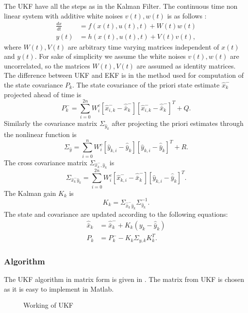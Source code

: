The UKF have all the steps as in the Kalman Filter. The continuous time non linear system with additive white noises $v(t),w(t)$ is as follows \citep{sim07}:
\begin{equation}
    \label{eq:ukf_nlsys}
    \begin{split}
       \frac{dx}{dt} &= f(x(t),u(t),t) + W(t)w(t) \\
       y(t) &= h(x(t),u(t),t) + V(t)v(t),
    \end{split}
\end{equation} 
where $W(t),V(t)$ are arbitrary time varying matrices independent of $x(t)$ and $y(t)$. For sake of simplicity we assume the white noises $v(t),w(t)$  are uncorrelated, so the matrices $W(t),V(t)$ are assumed as identity matrices. The difference between UKF and EKF is in the method used for computation of the state covariance $P_k$. The state covariance of the priori state estimate $\hat x_k^-$ projected ahead of time is $$ P_k^- = \sum \limits_{i=0}^{2n} W_i^c [\hat x_{i,k}^- - \hat{\bar x}_k^-] [\hat x_{i,k}^- - \hat{\bar x}_k^-]^T + Q. $$
Similarly the covariance matrix $\Sigma_{\hat y_k}$ after projecting the priori estimates through the nonlinear function is $$ \Sigma_{\hat y} = \sum \limits_{i=0}^n W_i^c [\hat{y}_{k,i} - \hat{\bar y}_k ] [ \hat{y}_{k,i} - \hat{\bar y}_k] ^T+R.$$
The cross covariance matrix $\Sigma_{\hat x_k^-, \hat y_k}$ is $$ \Sigma_{\hat x_k^- \hat y_k} = \sum \limits_{i=0}^{2n} W_i^c [\hat x_{k,i}^- - \hat{\bar x}_k^- ] [ \hat y_{k,i} - \hat{\bar y}_k] ^T .$$
The Kalman gain $K_k$ is $$K_k = \Sigma_{\hat{\bar x}_k^- \hat y_k} \Sigma_{\hat y_k}^{-1}.$$
The state and covariance are updated according to the following equations:
$$  \begin{aligned}
    \hat{\bar{x}}_k &= \hat{\bar{x}}_k^- + K_k(y_k - \hat{\bar y}_k)\\
    P_k &= P_k^- - K_k \Sigma_{y,k} K_k^T.
    \end{aligned}
    $$
\subsubsection{Algorithm}
The UKF algorithm in matrix form is given in \citep{sim07}. The matrix from UKF is chosen as it is easy to implement in Matlab.
\begin{figure}[H] 
    \centering
    
    \caption{Working of UKF}
    \label{fig:ukf_blk}
\end{figure}

